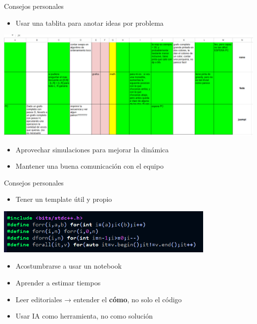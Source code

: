 \documentclass{beamer}
\begin{document}
\begin{frame}[fragile]{Consejos personales}
  \begin{itemize}
  \item  Usar una tablita para anotar ideas por problema
  \end{itemize}

  \includegraphics[width=1\textwidth,keepaspectratio]{fotos/tablita.png}

  \begin{itemize}
  \item Aprovechar simulaciones para mejorar la dinámica
  \item Mantener una buena comunicación con el equipo
  \end{itemize}

\end{frame}


\begin{frame}[fragile]{Consejos personales}
  \begin{itemize}
  \item Tener un template útil y propio
  \end{itemize}
  \includegraphics[width=0.8\textwidth,keepaspectratio]{fotos/template.png}

  \begin{itemize}
  \item Acostumbrarse a usar un notebook
  
  \item Aprender a estimar tiempos 
  \item Leer editoriales → entender el \textbf{cómo}, no solo el código
  \item Usar IA como herramienta, no como solución
  \end{itemize}
\end{frame}
\end{document}
